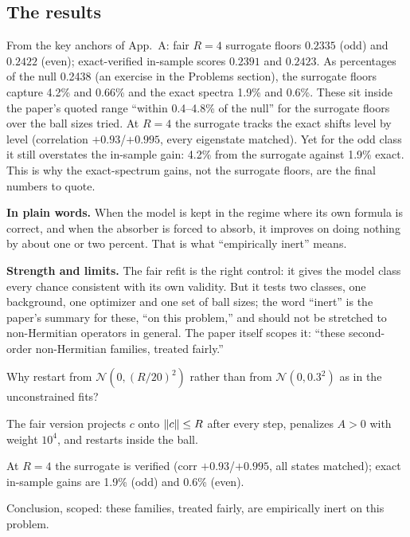 \subsection{The results}

From the key anchors of App.~A: fair $R=4$ surrogate floors $0.2335$ (odd) and $0.2422$ (even); exact-verified in-sample scores $0.2391$ and $0.2423$. As percentages of the null 0.2438 (an exercise in the Problems section), the surrogate floors capture 4.2\% and 0.66\% and the exact spectra 1.9\% and 0.6\%. These sit inside the paper's quoted range ``within 0.4--4.8\% of the null'' for the surrogate floors over the ball sizes tried. At $R=4$ the surrogate tracks the exact shifts level by level (correlation $+0.93$/$+0.995$, every eigenstate matched). Yet for the odd class it still overstates the in-sample gain: 4.2\% from the surrogate against 1.9\% exact. This is why the exact-spectrum gains, not the surrogate floors, are the final numbers to quote.

\textbf{In plain words.} When the model is kept in the regime where its own formula is correct, and when the absorber is forced to absorb, it improves on doing nothing by about one or two percent. That is what ``empirically inert'' means.

\textbf{Strength and limits.} The fair refit is the right control: it gives the model class every chance consistent with its own validity. But it tests two classes, one background, one optimizer and one set of ball sizes; the word ``inert'' is the paper's summary for these, ``on this problem,'' and should not be stretched to non-Hermitian operators in general. The paper itself scopes it: ``these second-order non-Hermitian families, treated fairly.''

\begin{checkpoint}
Why restart from $\mathcal N(0,(R/20)^2)$ rather than from $\mathcal N(0,0.3^2)$ as in the unconstrained fits?
\end{checkpoint}

\begin{keyideas}
\item The fair version projects $c$ onto $\left\lVert c\right\rVert\le R$ after every step, penalizes $A>0$ with weight $10^4$, and restarts inside the ball.
\item At $R=4$ the surrogate is verified (corr $+0.93$/$+0.995$, all states matched); exact in-sample gains are 1.9\% (odd) and 0.6\% (even).
\item Conclusion, scoped: these families, treated fairly, are empirically inert on this problem.
\end{keyideas}

